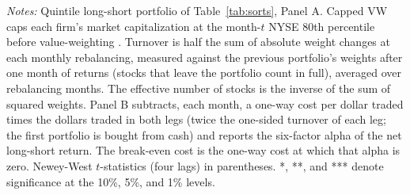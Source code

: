 \begin{table}[!htbp]
\par\vspace{4pt}\begin{minipage}{\linewidth}\scriptsize \emph{Notes:} Quintile long-short portfolio of Table~\ref{tab:sorts}, Panel A. Capped VW caps each firm's market capitalization at the month-$t$ NYSE 80th percentile before value-weighting \citep{JensenKellyPedersen2023}. Turnover is half the sum of absolute weight changes at each monthly rebalancing, measured against the previous portfolio's weights after one month of returns (stocks that leave the portfolio count in full), averaged over rebalancing months. The effective number of stocks is the inverse of the sum of squared weights. Panel B subtracts, each month, a one-way cost per dollar traded times the dollars traded in both legs (twice the one-sided turnover of each leg; the first portfolio is bought from cash) and reports the six-factor alpha of the net long-short return. The break-even cost is the one-way cost at which that alpha is zero. Newey-West $t$-statistics (four lags) in parentheses. *, **, and *** denote significance at the 10\%, 5\%, and 1\% levels.\end{minipage}
\end{table}